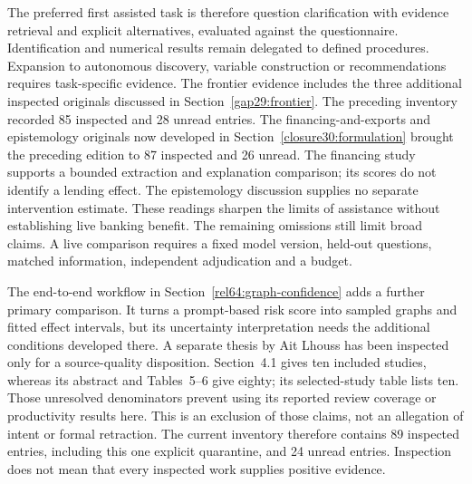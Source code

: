 The preferred first assisted task is therefore question clarification
with evidence retrieval and explicit alternatives, evaluated against
the questionnaire. Identification and numerical results remain delegated
to defined procedures. Expansion to autonomous discovery, variable
construction or recommendations requires task-specific evidence. The
frontier evidence includes the three additional inspected originals discussed
in Section~\ref{gap29:frontier}. The preceding inventory recorded 85 inspected
and 28 unread entries. The financing-and-exports and epistemology originals
now developed in Section~\ref{closure30:formulation} brought the preceding edition to
87 inspected and 26 unread. The financing study supports a bounded extraction
and explanation comparison; its scores do not identify a lending effect.
The epistemology discussion supplies no separate intervention estimate. These
readings sharpen the limits of assistance without establishing live banking
benefit. The remaining omissions still limit broad claims. A live comparison
requires a fixed model version, held-out questions, matched information,
independent adjudication and a budget.~\citep{rel18li,rel18mugleston}

The end-to-end workflow in Section~\ref{rel64:graph-confidence} adds a
further primary comparison. It turns a prompt-based risk score into sampled
graphs and fitted effect intervals, but its uncertainty interpretation needs
the additional conditions developed there. A separate thesis by Ait Lhouss
has been inspected only for a source-quality disposition. Section~4.1 gives
ten included studies, whereas its abstract and Tables~5--6 give eighty; its
selected-study table lists ten. Those unresolved denominators prevent using
its reported review coverage or productivity results here. This is an
exclusion of those claims, not an allegation of intent or formal retraction.
The current inventory therefore contains 89 inspected entries, including
this one explicit quarantine, and 24 unread entries. Inspection does not
mean that every inspected work supplies positive evidence. \citep{rel64molero,rel64aitlhouss}




